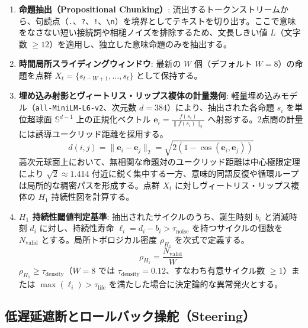 \documentclass[11pt,a4paper]{article}
\begin{document}
\begin{enumerate}
    \item \textbf{命題抽出（Propositional Chunking）}: 流出するトークンストリームから、句読点（\texttt{.}、\texttt{?}、\texttt{!}、\texttt{\textbackslash n}）を境界としてテキストを切り出す。ここで意味をなさない短い接続詞や相槌ノイズを排除するため、文長しきい値 $L$（文字数 $\ge 12$）を適用し、独立した意味命題のみを抽出する。
    \item \textbf{時間局所スライディングウィンドウ}: 最新の $W$ 個（デフォルト $W=8$）の命題を点群 $X_t = \{s_{t-W+1}, \dots, s_t\}$ として保持する。
    \item \textbf{埋め込み射影とヴィートリス・リップス複体の計量幾何}: 軽量埋め込みモデル（\texttt{all-MiniLM-L6-v2}、次元数 $d=384$）により、抽出された各命題 $s_i$ を単位超球面 $\mathbb{S}^{d-1}$ 上の正規化ベクトル $\mathbf{e}_i = \frac{f(s_i)}{\|f(s_i)\|_2}$ へ射影する。2点間の計量には誘導ユークリッド距離を採用する。
    \begin{equation}
    d(i, j) = \|\mathbf{e}_i - \mathbf{e}_j\|_2 = \sqrt{2(1 - \cos(\mathbf{e}_i, \mathbf{e}_j))}
    \end{equation}
    高次元球面上において、無相関な命題対のユークリッド距離は中心極限定理により $\sqrt{2} \approx 1.414$ 付近に鋭く集中する一方、意味的同語反復や循環ループは局所的な稠密パスを形成する。点群 $X_t$ に対しヴィートリス・リップス複体の $H_1$ 持続性図を計算する。
    \item \textbf{$H_1$ 持続性閾値判定基準}: 抽出されたサイクルのうち、誕生時刻 $b_i$ と消滅時刻 $d_i$ に対し、持続性寿命 $\ell_i = d_i - b_i > \tau_{\mathrm{noise}}$ を持つサイクルの個数を $N_{\mathrm{valid}}$ とする。局所トポロジカル密度 $\rho_{H_1}$ を次式で定義する。
    \begin{equation}
    \rho_{H_1} = \frac{N_{\mathrm{valid}}}{W}
    \end{equation}
    $\rho_{H_1} \ge \tau_{\mathrm{density}}$（$W=8$ では $\tau_{\mathrm{density}}=0.12$、すなわち有意サイクル数 $\ge 1$）または $\max(\ell_i) > \tau_{\mathrm{life}}$ を満たした場合に決定論的な異常発火とする。
\end{enumerate}

\subsection{低遅延遮断とロールバック操舵（Steering）}
\end{document}
